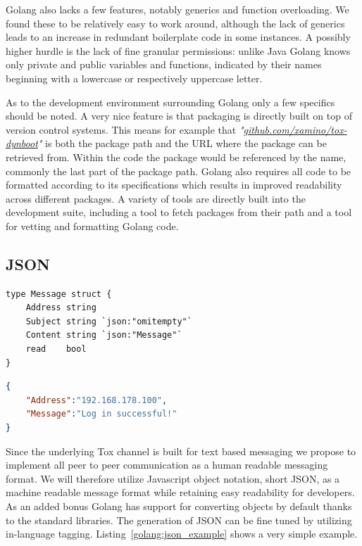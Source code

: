 Golang also lacks a few features, notably generics and function overloading.
We found these to be relatively easy to work around, although the lack of generics leads to an increase in redundant boilerplate code in some instances.
A possibly higher hurdle is the lack of fine granular permissions: unlike Java Golang knows only private and public variables and functions, indicated by their names beginning with a lowercase or respectively uppercase letter.

As to the development environment surrounding Golang only a few specifics should be noted.
A very nice feature is that packaging is directly built on top of version control systems.
This means for example that \textit{"\href{https://github.com/xamino/tox-dynboot}{github.com/xamino/tox-dynboot}"} is both the package path and the URL where the package can be retrieved from.
Within the code the package would be referenced by the name, commonly the last part of the package path.
Golang also requires all code to be formatted according to its specifications which results in improved readability across different packages.
A variety of tools are directly built into the development suite, including a tool to fetch packages from their path and a tool for vetting and formatting Golang code.

\subsection{JSON}
\label{sub:JSON}

\begin{listing}[htp]
    \begin{lstlisting}[language=golang,firstnumber=0]
type Message struct {
    Address string
    Subject string `json:"omitempty"`
    Content string `json:"Message"`
    read    bool
}
    \end{lstlisting}
    \begin{lstlisting}[language=json,firstnumber=0]
{
    "Address":"192.168.178.100",
    "Message":"Log in successful!"
}
    \end{lstlisting}
\caption[Golang JSON Example]{
    An example Golang struct with tags and its corresponding JSON representation.
    Note that \textit{"Subject"} is missing from the JSON due to the \textit{"omitempty"} tag and \textit{"read"} due to it being private.
    Also note that \textit{"Content"} has been renamed to \textit{"Message"}.
}
\label{golang:json_example}
\end{listing}

Since the underlying Tox channel is built for text based messaging we propose to implement all peer to peer communication as a human readable messaging format.
We will therefore utilize Javascript object notation, short JSON, as a machine readable message format while retaining easy readability for developers.
As an added bonus Golang has support for converting objects by default thanks to the standard libraries.
The generation of JSON can be fine tuned by utilizing in-language tagging.
Listing~\ref{golang:json_example} shows a very simple example.

